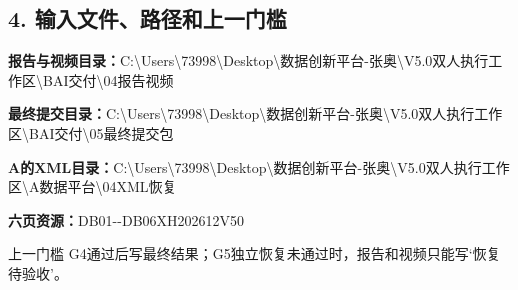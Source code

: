 \documentclass[UTF8,openany,zihao=-4]{ctexbook}
\renewcommand{\_}{\textunderscore\allowbreak}
\begin{document}
\subsection*{4. 输入文件、路径和上一门槛}
\noindent\textbf{报告与视频目录：}{\promptlatin\promptcjk\small C:\textbackslash{}\allowbreak{}Users\textbackslash{}\allowbreak{}73998\textbackslash{}\allowbreak{}Desktop\textbackslash{}\allowbreak{}数据创新平台-\allowbreak{}张奥\textbackslash{}\allowbreak{}V5.0\_\allowbreak{}双人执行工作区\textbackslash{}\allowbreak{}B\_\allowbreak{}AI交付\textbackslash{}\allowbreak{}04\_\allowbreak{}报告视频}\par
\noindent\textbf{最终提交目录：}{\promptlatin\promptcjk\small C:\textbackslash{}\allowbreak{}Users\textbackslash{}\allowbreak{}73998\textbackslash{}\allowbreak{}Desktop\textbackslash{}\allowbreak{}数据创新平台-\allowbreak{}张奥\textbackslash{}\allowbreak{}V5.0\_\allowbreak{}双人执行工作区\textbackslash{}\allowbreak{}B\_\allowbreak{}AI交付\textbackslash{}\allowbreak{}05\_\allowbreak{}最终提交包}\par
\noindent\textbf{A的XML目录：}{\promptlatin\promptcjk\small C:\textbackslash{}\allowbreak{}Users\textbackslash{}\allowbreak{}73998\textbackslash{}\allowbreak{}Desktop\textbackslash{}\allowbreak{}数据创新平台-\allowbreak{}张奥\textbackslash{}\allowbreak{}V5.0\_\allowbreak{}双人执行工作区\textbackslash{}\allowbreak{}A\_\allowbreak{}数据平台\textbackslash{}\allowbreak{}04\_\allowbreak{}XML恢复}\par
\noindent\textbf{六页资源：}{\promptlatin\promptcjk\small DB01-\allowbreak{}-\allowbreak{}DB06\_\allowbreak{}XH202612\_\allowbreak{}V50}\par
\begin{gatebox}{上一门槛}
G4通过后写最终结果；G5独立恢复未通过时，报告和视频只能写‘恢复待验收’。

\end{gatebox}
\end{document}
